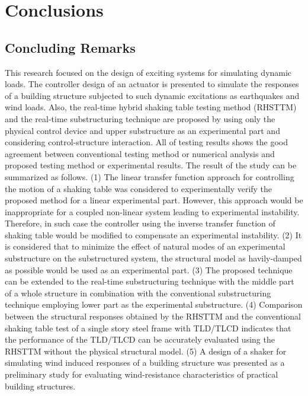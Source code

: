 \chapter{Conclusions}
\section{Concluding Remarks}
This research focused on the design of exciting systems for simulating dynamic loads. The controller design of an actuator is presented to simulate the responses of a building structure subjected to such dynamic excitations as earthquakes and wind loads. Also, the real-time hybrid shaking table testing method (RHSTTM) and the real-time substructuring technique are proposed by using only the physical control device and upper substructure as an experimental part and considering control-structure interaction.
All of testing results shows the good agreement between conventional testing method or numerical analysis and proposed testing method or experimental results.
The result of the study can be summarized as follows.  
(1) The linear transfer function approach for controlling the motion of a shaking table was considered to experimentally verify the proposed method for a linear experimental part. However, this approach would be inappropriate for a coupled non-linear system leading to experimental instability. Therefore, in such case the controller using the inverse transfer function of shaking table would be modified to compensate an experimental instability. 
(2) It is considered that to minimize the effect of natural modes of an experimental substructure on the substructured system, the structural model as havily-damped as possible would be used as an experimental part.
(3) The proposed technique can be extended to the real-time substructuring technique with the middle part of a whole structure in combination with the conventional substructuring technique employing lower part as the experimental substructure. 
(4) Comparison between the structural responses obtained by the RHSTTM and the conventional shaking table test of a single story steel frame with TLD/TLCD indicates that the performance of the TLD/TLCD can be accurately evaluated using the RHSTTM without the physical structural model.
(5) A design of a shaker for simulating wind induced responses of a building structure was presented as a preliminary study for evaluating wind-resistance characteristics of practical building structures. 
